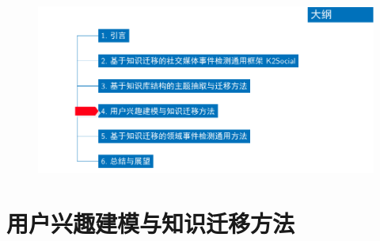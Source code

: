 \begin{withoutheadline}
\begin{frame}
\vspace*{-13mm}
\begin{figure}
	\hspace*{-4.2mm}
    \includegraphics[width=1.0\paperwidth]{img/contents4_output.pdf}
\end{figure}

\end{frame}
\end{withoutheadline}

\section{用户兴趣建模与知识迁移方法}

%


